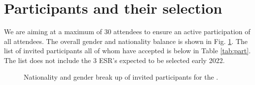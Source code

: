\section{Participants and their selection}

We are aiming at a maximum of 30 attendees to ensure an active
participation of all attendees. The overall gender and nationality
balance is shown in Fig. \ref{fig:country}. The list of invited
participants all of whom have accepted is below in Table
\ref{tab:part}. The list does not include the 3 ESR's expected to be
selected early 2022.

\begin{figure}[!b]
  \centering 
  \caption{Nationality and gender break up of invited participants for
    the \sympe.}
  \label{fig:country}
\end{figure}







